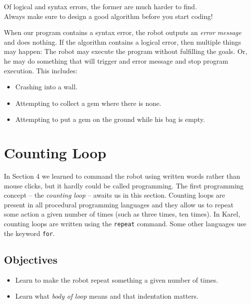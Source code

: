 \begin{gbox}
\begin{center}
Of logical and syntax errors, the former are much harder to find.\\
Always make sure to design a good algorithm before you start coding!
\end{center}
\end{gbox}
\vspace{4mm}

\noindent
When our program contains a syntax error,
the robot outputs an {\em error message} and does nothing.
If the algorithm contains a logical error, then multiple 
things may happen: The robot may execute the program 
without fulfilling the goals. Or, he may do something 
that will trigger and error message and stop program 
execution. This includes:

\begin{itemize}
\item Crashing into a wall.
\item Attempting to collect a gem where there is none.
\item Attempting to put a gem on the ground while his bag is empty.
\end{itemize}


\section{Counting Loop} \label{sec:repeat}

In Section 4 we learned to command the robot using written words rather than mouse 
clicks, but it hardly could be called programming. The first programming concept -- 
the {\em counting loop} -- awaits us in this section. Counting loops 
are present in all procedural programming languages and they
allow us to repeat some action a given number of times (such 
as three times, ten times). In Karel, counting loops are written using the 
{\tt repeat} command. Some other languages use the keyword {\tt for}.  

\subsection{Objectives} 

\begin{itemize}
\item Learn to make the robot repeat something a given number of times.
\item Learn what {\em body of loop} means and that indentation matters.
\end{itemize}


